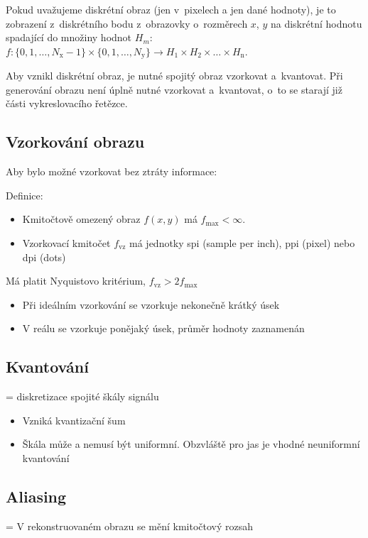 Pokud uvažujeme diskrétní obraz (jen v~pixelech a jen dané hodnoty), je to zobrazení z~diskrétního bodu z~obrazovky o~rozměrech \(x\), \(y\) na diskrétní hodnotu spadající do množiny hodnot \(H_m\): \(f:\{0,1,\dots,N_\mathrm{x}-1\}\times\{0,1,\dots,N_\mathrm{y}\}\rightarrow H_1\times H_2 \times \dots \times H_\mathrm{n}\).

Aby vznikl diskrétní obraz, je nutné spojitý obraz vzorkovat a~kvantovat. Při generování obrazu není úplně nutné vzorkovat a~kvantovat, o~to se starají již části vykreslovacího řetězce.

\subsection{Vzorkování obrazu}
Aby bylo možné vzorkovat bez ztráty informace:

Definice:
\begin{itemize}
    \item Kmitočtově omezený obraz \(f(x,y)\) má \(f_\mathrm{max}<\infty\).
    \item Vzorkovací kmitočet \(f_\mathrm{vz}\) má jednotky spi (sample per inch), ppi (pixel) nebo dpi (dots)
\end{itemize}
Má platit Nyquistovo kritérium, \(f_\mathrm{vz}>2f_\mathrm{max}\)

\begin{itemize}
    \item Při ideálním vzorkování se vzorkuje nekonečně krátký úsek
    \item V reálu se vzorkuje ponějaký úsek, průměr hodnoty zaznamenán
\end{itemize}

\subsection{Kvantování}
= diskretizace spojité škály signálu

\begin{itemize}
    \item Vzniká kvantizační šum
    \item Škála může a nemusí být uniformní. Obzvláště pro jas je vhodné neuniformní kvantování
\end{itemize}

\subsection{Aliasing}
= V rekonstruovaném obrazu se mění kmitočtový rozsah

